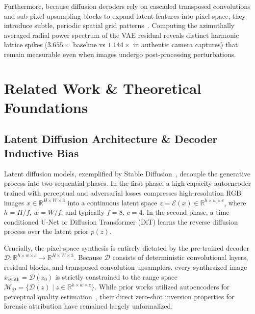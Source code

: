 \documentclass[conference]{IEEEtran}
\theoremstyle{definition}
\begin{document}
Furthermore, because diffusion decoders rely on cascaded transposed convolutions and sub-pixel upsampling blocks to expand latent features into pixel space, they introduce subtle, periodic spatial grid patterns~\cite{durall2020watch,frank2020leveraging}. Computing the azimuthally averaged radial power spectrum of the VAE residual reveals distinct harmonic lattice spikes ($3.655\times$ baseline vs $1.144\times$ in authentic camera captures) that remain measurable even when images undergo post-processing perturbations.

\section{Related Work \& Theoretical Foundations}

\subsection{Latent Diffusion Architecture \& Decoder Inductive Bias}
Latent diffusion models, exemplified by Stable Diffusion~\cite{rombach2022ldm}, decouple the generative process into two sequential phases. In the first phase, a high-capacity autoencoder trained with perceptual and adversarial losses compresses high-resolution RGB images $x \in \mathbb{R}^{H \times W \times 3}$ into a continuous latent space $z = \mathcal{E}(x) \in \mathbb{R}^{h \times w \times c}$, where $h = H/f$, $w = W/f$, and typically $f = 8$, $c = 4$. In the second phase, a time-conditioned U-Net or Diffusion Transformer (DiT) learns the reverse diffusion process over the latent prior $p(z)$. 

Crucially, the pixel-space synthesis is entirely dictated by the pre-trained decoder $\mathcal{D}: \mathbb{R}^{h \times w \times c} \to \mathbb{R}^{H \times W \times 3}$. Because $\mathcal{D}$ consists of deterministic convolutional layers, residual blocks, and transposed convolution upsamplers, every synthesized image $x_{\text{synth}} = \mathcal{D}(z_0)$ is strictly constrained to the range space $\mathcal{M}_{\mathcal{D}} = \{ \mathcal{D}(z) \mid z \in \mathbb{R}^{h \times w \times c} \}$. While prior works utilized autoencoders for perceptual quality estimation~\cite{ojha2023towards}, their direct zero-shot inversion properties for forensic attribution have remained largely unformalized.
\end{document}
